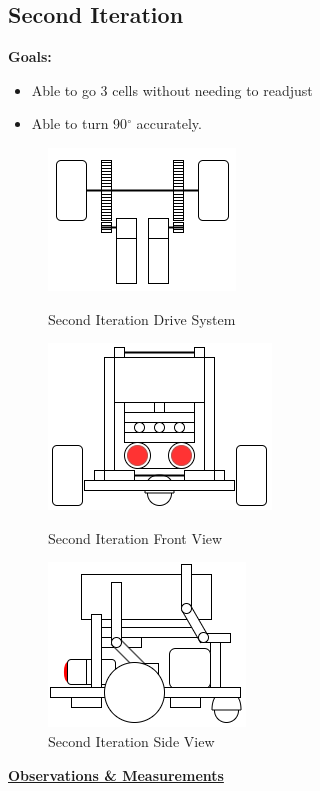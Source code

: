 \documentclass[11pt]{article}
\begin{document}
\subsection{Second Iteration}
\textbf{Goals:}
\begin{itemize}
\item Able to go 3 cells without needing to readjust
\item Able to turn 90$^{\circ}$ accurately.
\end{itemize}
\begin{figure}[htp]
\centering
\captionsetup{justification=centering}
\includegraphics[scale=0.80]{images/Hardware_Mechanical/Third_Iteration_Design_drive.png}
\caption{Second Iteration Drive System}\label{fig:Drive System}
\endminipage\hfill
{}
\includegraphics[scale=0.70]{images/Hardware_Mechanical/Third_Iteration_Design_front.png}
\caption{Second Iteration Front View}\label{fig:Front View}
\endminipage\hfill
{}
\includegraphics[scale=0.70]{images/Hardware_Mechanical/Third_Iteration_Design_side.png}
\caption{Second Iteration Side View}\label{Side View}
\endminipage
\end{figure}
\underline{\textbf{Observations \& Measurements}}\\\\
\end{document}
